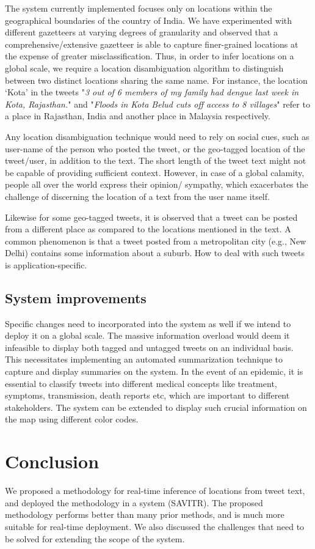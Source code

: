 The system currently implemented focuses only on locations within the geographical boundaries of the country of India. 
We have experimented with different gazetteers at varying degrees of granularity and observed that a comprehensive/extensive gazetteer is able to capture finer-grained locations at the expense of greater misclassification. 
Thus, in order to infer locations on a global scale, we require a location disambiguation algorithm to distinguish between two distinct locations sharing the same name. For instance, the location `Kota' in the tweets "\textit{3 out of 6 members of my family had dengue last week in Kota, Rajasthan.}" and "\textit{Floods in Kota Belud cuts off access to 8 villages}" refer to a place in Rajasthan, India and another place in Malaysia respectively.

Any location disambiguation technique would need to rely on social cues, such as user-name of the person who posted the tweet, or the geo-tagged location of the tweet/user, in addition to the text. 
The short length of the tweet text might not be capable of providing sufficient context. However, in case of a global calamity, people all over the world express their opinion/ sympathy, which exacerbates the challenge of discerning the location of a text from the user name itself.

Likewise for some geo-tagged tweets, it is observed that a tweet can be posted from a different place as compared to the locations mentioned in the text. 
A common phenomenon is that a tweet posted from a metropolitan city (e.g., New Delhi) contains some information about a suburb. How to deal with such 
tweets is application-specific.

\subsection{System improvements}
Specific changes need to incorporated into the system as well if we intend to deploy it on a global scale. 
The massive information overload would deem it infeasible to display both tagged and untagged tweets on an individual basis. This necessitates implementing an automated summarization technique to capture and display summaries on the system. 
In the event of an epidemic, it is essential to classify tweets into different medical concepts like treatment, symptoms, transmission, death reports etc, which are important to different stakeholders. The system can be extended to display such crucial information on the map using different color codes. 


\section{Conclusion}

We proposed a methodology for real-time inference of locations from tweet text, and deployed the methodology in a system (SAVITR). The proposed methodology performs better than many prior methods, and is much more suitable for real-time deployment.
We also discussed the challenges that need to be solved for extending the scope of the system. 




